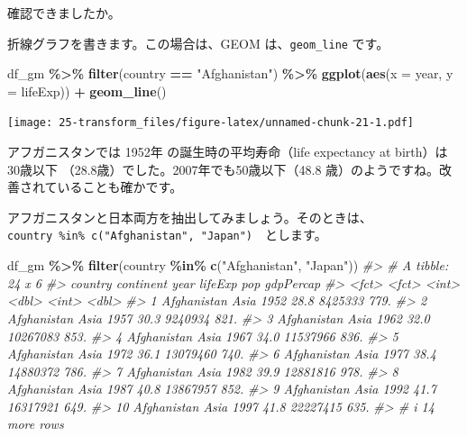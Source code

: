 \documentclass[
  xelatex, ja=standard]{bxjsbook}
\newenvironment{Shaded}{\begin{snugshade}}{\end{snugshade}}
\newcommand{\AttributeTok}[1]{\textcolor[rgb]{0.13,0.29,0.53}{#1}}
\newcommand{\CommentTok}[1]{\textcolor[rgb]{0.56,0.35,0.01}{\textit{#1}}}
\newcommand{\FunctionTok}[1]{\textcolor[rgb]{0.13,0.29,0.53}{\textbf{#1}}}
\newcommand{\NormalTok}[1]{#1}
\newcommand{\SpecialCharTok}[1]{\textcolor[rgb]{0.81,0.36,0.00}{\textbf{#1}}}
\newcommand{\StringTok}[1]{\textcolor[rgb]{0.31,0.60,0.02}{#1}}
\theoremstyle{definition}
\theoremstyle{definition}
\theoremstyle{definition}
\theoremstyle{definition}
\theoremstyle{remark}
\begin{document}
確認できましたか。

折線グラフを書きます。この場合は、GEOM は、\texttt{geom\_line} です。

\begin{Shaded}
\begin{Highlighting}[]
\NormalTok{df\_gm }\SpecialCharTok{\%\textgreater{}\%} \FunctionTok{filter}\NormalTok{(country }\SpecialCharTok{==} \StringTok{"Afghanistan"}\NormalTok{) }\SpecialCharTok{\%\textgreater{}\%}
  \FunctionTok{ggplot}\NormalTok{(}\FunctionTok{aes}\NormalTok{(}\AttributeTok{x =}\NormalTok{ year, }\AttributeTok{y =}\NormalTok{ lifeExp)) }\SpecialCharTok{+} \FunctionTok{geom\_line}\NormalTok{()}
\end{Highlighting}
\end{Shaded}

\texttt{[image: 25-transform\_files/figure-latex/unnamed-chunk-21-1.pdf]}

アフガニスタンでは 1952年 の誕生時の平均寿命（life expectancy at birth）は　30歳以下 （28.8歳）でした。2007年でも50歳以下（48.8 歳）のようですね。改善されていることも確かです。

アフガニスタンと日本両方を抽出してみましょう。そのときは、 \texttt{country\ \%in\%\ c("Afghanistan",\ "Japan")}　とします。

\begin{Shaded}
\begin{Highlighting}[]
\NormalTok{df\_gm }\SpecialCharTok{\%\textgreater{}\%} \FunctionTok{filter}\NormalTok{(country }\SpecialCharTok{\%in\%} \FunctionTok{c}\NormalTok{(}\StringTok{"Afghanistan"}\NormalTok{, }\StringTok{"Japan"}\NormalTok{))}
\CommentTok{\#\textgreater{} \# A tibble: 24 x 6}
\CommentTok{\#\textgreater{}    country     continent  year lifeExp      pop gdpPercap}
\CommentTok{\#\textgreater{}    \textless{}fct\textgreater{}       \textless{}fct\textgreater{}     \textless{}int\textgreater{}   \textless{}dbl\textgreater{}    \textless{}int\textgreater{}     \textless{}dbl\textgreater{}}
\CommentTok{\#\textgreater{}  1 Afghanistan Asia       1952    28.8  8425333      779.}
\CommentTok{\#\textgreater{}  2 Afghanistan Asia       1957    30.3  9240934      821.}
\CommentTok{\#\textgreater{}  3 Afghanistan Asia       1962    32.0 10267083      853.}
\CommentTok{\#\textgreater{}  4 Afghanistan Asia       1967    34.0 11537966      836.}
\CommentTok{\#\textgreater{}  5 Afghanistan Asia       1972    36.1 13079460      740.}
\CommentTok{\#\textgreater{}  6 Afghanistan Asia       1977    38.4 14880372      786.}
\CommentTok{\#\textgreater{}  7 Afghanistan Asia       1982    39.9 12881816      978.}
\CommentTok{\#\textgreater{}  8 Afghanistan Asia       1987    40.8 13867957      852.}
\CommentTok{\#\textgreater{}  9 Afghanistan Asia       1992    41.7 16317921      649.}
\CommentTok{\#\textgreater{} 10 Afghanistan Asia       1997    41.8 22227415      635.}
\CommentTok{\#\textgreater{} \# i 14 more rows}
\end{Highlighting}
\end{Shaded}
\end{document}
